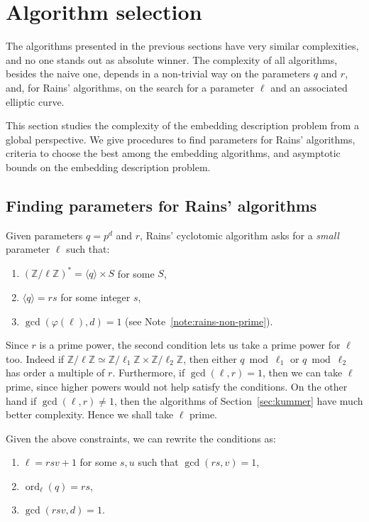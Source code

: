 \documentclass[12pt]{article}
\theoremstyle{plain}
\theoremstyle{definition}
\DeclareMathOperator{\order}{ord} %
\def\Z{\ensuremath{\mathbb{Z}}}
\def\euler{\ensuremath{\varphi}}
\newcounter{algorithm}
\begin{document}
\section{Algorithm selection}
\label{sec:selection}

The algorithms presented in the previous sections have very similar
complexities, and no one stands out as absolute winner. The complexity
of all algorithms, besides the naive one, depends in a non-trivial way
on the parameters $q$ and $r$, and, for Rains' algorithms, on the
search for a parameter $\ell$ and an associated elliptic curve.

This section studies the complexity of the embedding description
problem from a global perspective. We give procedures to find
parameters for Rains' algorithms, criteria to choose the best among
the embedding algorithms, and asymptotic bounds on the embedding
description problem.


\subsection{Finding parameters for Rains' algorithms}

Given parameters $q=p^d$ and $r$, Rains' cyclotomic algorithm asks for
a \emph{small} parameter $\ell$ such that:
\begin{enumerate}
\item $(\Z/\ell\Z)^\ast = \langle q\rangle \times S$ for some $S$,
\item $\langle q \rangle = rs$ for some integer $s$,
\item $\gcd(\euler(\ell),d)=1$ (see Note~\ref{note:rains-non-prime}).
\end{enumerate}

Since $r$ is a prime power, the second condition lets us take a prime
power for $\ell$ too. Indeed if
$\Z/\ell\Z\simeq\Z/\ell_1\Z\times\Z/\ell_2\Z$, then either
$q\bmod\ell_1$ or $q\bmod\ell_2$ has order a multiple of $r$.
Furthermore, if $\gcd(\ell,r)=1$, then we can take $\ell$ prime, since
higher powers would not help satisfy the conditions. On the other hand
if $\gcd(\ell,r)\ne1$, then the algorithms of Section~\ref{sec:kummer} have much
better complexity. Hence we shall take $\ell$ prime.

Given the above constraints, we can rewrite the conditions as:
\begin{enumerate}
\item $\ell = rsv + 1$ for some $s,u$ such that $\gcd(rs,v)=1$,
\item $\order_\ell(q) = rs$,
\item $\gcd(rsv,d)=1$.
\end{enumerate}
\end{document}
